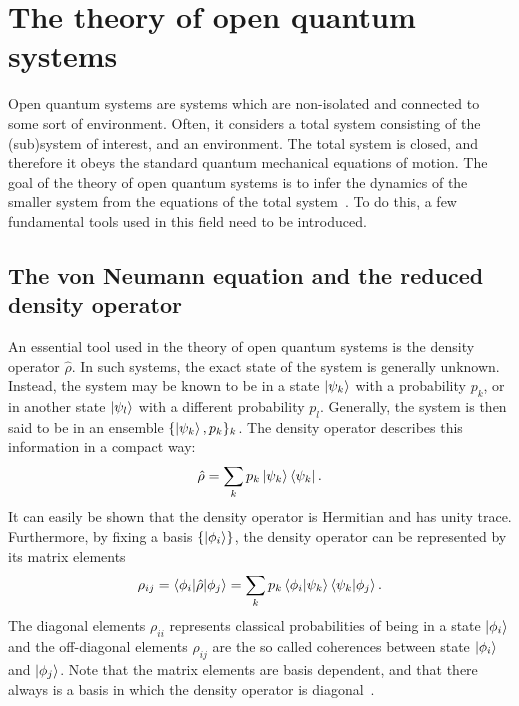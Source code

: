 \documentclass[../main.tex]{subfiles}
\begin{document}
\section{The theory of open quantum systems}
Open quantum systems are systems which are non-isolated and connected to some sort of environment. Often, it considers a total system consisting of the (sub)system of interest, and an environment. The total system is closed, and therefore it obeys the standard quantum mechanical equations of motion. The goal of the theory of open quantum systems is to infer the dynamics of the smaller system from the equations of the total system~\cite{lindblad}. To do this, a few fundamental tools used in this field need to be introduced.

\subsection{The von Neumann equation and the reduced density operator}

An essential tool used in the theory of open quantum systems is the density operator $\hat{\rho}$. In such systems, the exact state of the system is generally unknown. Instead, the system may be known to be in a state $\ket{\psi_k}$ with a probability $p_k$, or in another state $\ket{\psi_l}$ with a different probability $p_l$. Generally, the system is then said to be in an ensemble $\{\ket{\psi_k}, p_k\}_k$. The density operator describes this information in a compact way:
\begin{equation}
    \hat{\rho} = \sum_k p_k \ket{\psi_k}\bra{\psi_k}.
\end{equation}
It can easily be shown that the density operator is Hermitian and has unity trace. Furthermore, by fixing a basis $\{\ket{\phi_i}\}$, the density operator can be represented by its matrix elements 
\begin{equation}
    \rho_{ij} = \braket{\phi_i|\hat\rho|\phi_j} = \sum_k p_k \braket{\phi_i|\psi_k}\braket{\psi_k|\phi_j}.
\end{equation}
The diagonal elements $\rho_{ii}$ represents classical probabilities of being in a state $\ket{\phi_i}$ and the off-diagonal elements $\rho_{ij}$ are the so called coherences between state $\ket{\phi_i}$ and $\ket{\phi_j}$. Note that the matrix elements are basis dependent, and that there always is a basis in which the density operator is diagonal~\cite{bookopen}.
\end{document}
